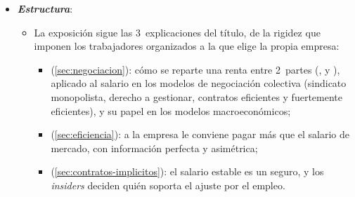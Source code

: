 \documentclass[11pt]{article}
\begin{document}
\begin{itemize}
\item \textbf{\emph{Estructura}}:
  \begin{itemize}
  \item La exposición sigue las 3~explicaciones del título, de la rigidez que imponen los trabajadores organizados a la que elige la propia empresa:
  \begin{itemize}
  \item {} (\ref{sec:negociacion}): cómo se reparte una renta entre 2~partes (,  y ), aplicado al salario en los modelos de negociación colectiva (sindicato monopolista, derecho a gestionar, contratos eficientes y fuertemente eficientes), y su papel en los modelos macroeconómicos;
  \item {} (\ref{sec:eficiencia}): a la empresa le conviene pagar más que el salario de mercado, con información perfecta\nocite{Solow1979Another} y asimétrica\nocite{ShapiroStiglitz1984Equilibrium};
  \item {} (\ref{sec:contratos-implicitos}): el salario estable es un seguro, y los \emph{insiders} deciden quién soporta el ajuste por el empleo.
  \end{itemize}
  \end{itemize}
\end{itemize}
\end{document}

